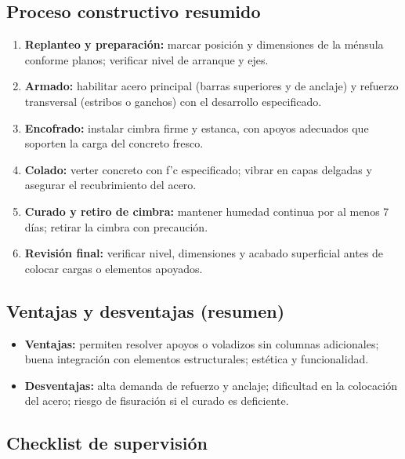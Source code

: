 \documentclass[12pt]{article}
\begin{document}
	\subsection*{Proceso constructivo resumido}
	\begin{enumerate}[leftmargin=*, itemsep=2pt]
		\item \textbf{Replanteo y preparación:} marcar posición y dimensiones de la ménsula conforme planos; verificar nivel de arranque y ejes.
		\item \textbf{Armado:} habilitar acero principal (barras superiores y de anclaje) y refuerzo transversal (estribos o ganchos) con el desarrollo especificado.
		\item \textbf{Encofrado:} instalar cimbra firme y estanca, con apoyos adecuados que soporten la carga del concreto fresco.
		\item \textbf{Colado:} verter concreto con f’c especificado; vibrar en capas delgadas y asegurar el recubrimiento del acero.
		\item \textbf{Curado y retiro de cimbra:} mantener humedad continua por al menos 7 días; retirar la cimbra con precaución.
		\item \textbf{Revisión final:} verificar nivel, dimensiones y acabado superficial antes de colocar cargas o elementos apoyados.
	\end{enumerate}
	
	\subsection*{Ventajas y desventajas (resumen)}
	\begin{itemize}[leftmargin=*, itemsep=2pt]
		\item \textbf{Ventajas:} permiten resolver apoyos o voladizos sin columnas adicionales; buena integración con elementos estructurales; estética y funcionalidad.
		\item \textbf{Desventajas:} alta demanda de refuerzo y anclaje; dificultad en la colocación del acero; riesgo de fisuración si el curado es deficiente.
	\end{itemize}
	
	\subsection{Checklist de supervisión}
	
\end{document}
